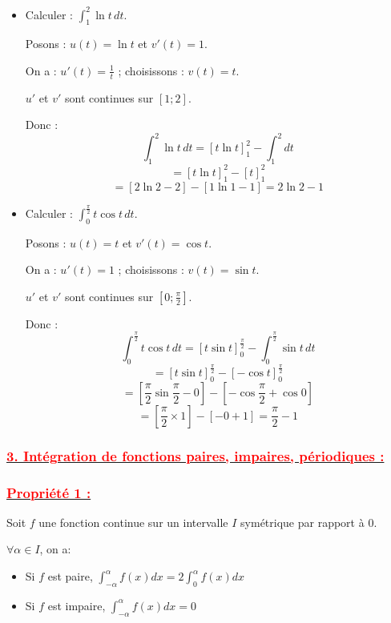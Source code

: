 \documentclass[12pt]{article}
\begin{document}
\begin{itemize}
    \item Calculer : \( \int_1^2 \ln t \, dt \).
    
    Posons : \( u(t) = \ln t \) et \( v'(t) = 1 \).
    
    On a : \( u'(t) = \frac{1}{t} \) ; choisissons : \( v(t) = t \).
    
    \( u' \) et \( v' \) sont continues sur \( [1 ; 2] \).
    
    Donc :
    \[
    \int_1^2 \ln t \, dt = \left[ t \ln t \right]_1^2 - \int_1^2 dt
    \]
    \[
    = \left[ t \ln t \right]_1^2 - \left[ t \right]_1^2
    \]
    \[
    = \left[ 2 \ln 2 - 2 \right] - \left[ 1 \ln 1 - 1 \right] = 2 \ln 2 - 1
    \]
    
    \item Calculer : \( \int_0^{\frac{\pi}{2}} t \cos t \, dt \).
    
    Posons : \( u(t) = t \) et \( v'(t) = \cos t \).
    
    On a : \( u'(t) = 1 \) ; choisissons : \( v(t) = \sin t \).
    
    \( u' \) et \( v' \) sont continues sur \( [0 ; \frac{\pi}{2}] \).
    
    Donc :
    \[
    \int_0^{\frac{\pi}{2}} t \cos t \, dt = \left[ t \sin t \right]_0^{\frac{\pi}{2}} - \int_0^{\frac{\pi}{2}} \sin t \, dt
    \]
    \[
    = \left[ t \sin t \right]_0^{\frac{\pi}{2}} - \left[ - \cos t \right]_0^{\frac{\pi}{2}}
    \]
    \[
    = \left[ \frac{\pi}{2} \sin \frac{\pi}{2} - 0 \right] - \left[ - \cos \frac{\pi}{2} + \cos 0 \right]
    \]
    \[
    = \left[ \frac{\pi}{2} \times 1 \right] - \left[ - 0 + 1 \right] = \frac{\pi}{2} - 1
    \]
\end{itemize}

\subsubsection*{\underline{\textcolor{red}{3. Intégration de fonctions paires, impaires, périodiques :}}}
\subsubsection*{\underline{\textcolor{red}{Propriété 1 :}}}
Soit \(f\) une fonction continue sur un intervalle \(I\) symétrique par rapport à \(0\).

\( \forall \alpha \in I \), on a:

\begin{itemize}
    \item Si \(f\) est paire, \( \int_{-\alpha}^{\alpha}f(x)dx = 2 \int_{0}^{\alpha}f(x)dx \)
    \item Si \(f\) est impaire, \( \int_{-\alpha}^{\alpha}f(x)dx =  0 \)
\end{itemize}
\end{document}
